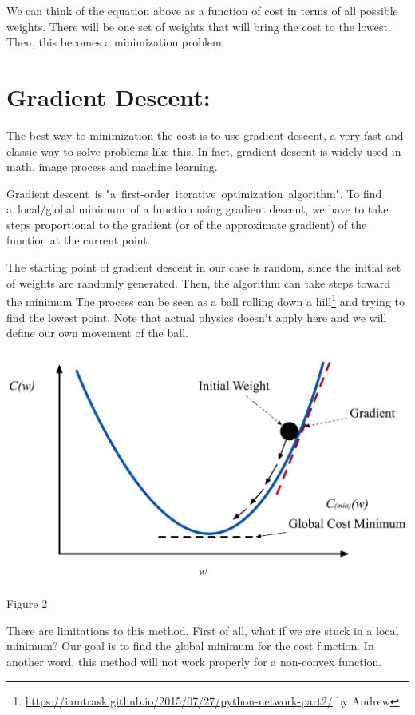 \documentclass[]{article}
\begin{document}
\begin{multicols}{2}
We can think of the equation above as a function of cost in terms of all
possible weights. There will be one set of weights that will bring the
cost to the lowest. Then, this becomes a minimization problem.

\section{Gradient Descent:}

The best way to minimization the cost is to use gradient descent, a very
fast and classic way to solve problems like this. In fact, gradient
descent is widely used in math, image process and machine learning.

Gradient descent~is "a~first-order~iterative~optimization~algorithm". To
find a~local/global minimum~of a function using gradient descent, we have to take
steps proportional to the gradient (or of the
approximate gradient) of the function at the current point.

The starting point of gradient descent in our case is random, since the initial set of weights are randomly generated. Then, the algorithm can take steps toward the minimum The process can be seen as a ball rolling down a
hill\footnote{\url{https://iamtrask.github.io/2015/07/27/python-network-part2/}
  by Andrew}
and trying to find the lowest point. Note that actual physics doesn't
apply here and we will define our own movement of the ball.

\centerline{\includegraphics[width=1\linewidth]{gd} }
\centerline{Figure 2}
\vspace{0.5cm}

There are limitations to this method. First of all, what if we are stuck
in a local minimum? Our goal is to find the global minimum for the cost
function. In another word, this method will not work properly for a non-convex
function. 


\end{multicols}
\end{document}
